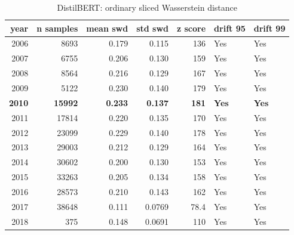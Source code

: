 \begin{table}[ht]
\centering
\caption{DistilBERT: ordinary sliced Wasserstein distance}
\label{tab:distilbert_ordinary_swd}
\begin{tabular}{rrrrrll}
\toprule
year & n samples & mean swd & std swd & z score & drift 95 & drift 99 \\
\midrule
2006 & 8693 & 0.179 & 0.115 & 136 & Yes & Yes \\
2007 & 6755 & 0.206 & 0.130 & 159 & Yes & Yes \\
2008 & 8564 & 0.216 & 0.129 & 167 & Yes & Yes \\
2009 & 5122 & 0.230 & 0.140 & 179 & Yes & Yes \\
\textbf{2010} & \textbf{15992} & \textbf{0.233} & \textbf{0.137} & \textbf{181} & \textbf{Yes} & \textbf{Yes} \\
2011 & 17814 & 0.220 & 0.135 & 170 & Yes & Yes \\
2012 & 23099 & 0.229 & 0.140 & 178 & Yes & Yes \\
2013 & 29003 & 0.212 & 0.129 & 164 & Yes & Yes \\
2014 & 30602 & 0.200 & 0.130 & 153 & Yes & Yes \\
2015 & 33263 & 0.205 & 0.134 & 158 & Yes & Yes \\
2016 & 28573 & 0.210 & 0.143 & 162 & Yes & Yes \\
2017 & 38648 & 0.111 & 0.0769 & 78.4 & Yes & Yes \\
2018 & 375 & 0.148 & 0.0691 & 110 & Yes & Yes \\
\bottomrule
\end{tabular}
\end{table}

